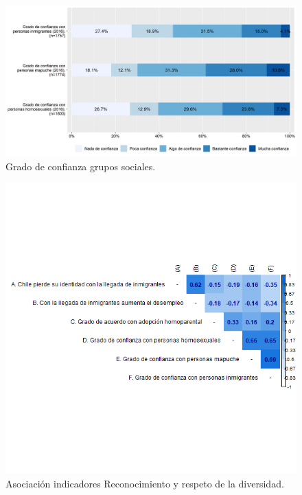 \documentclass[
  12pt,
]{book}
\begin{document}
\begin{figure}[H]

{\centering \includegraphics[width=1\linewidth,height=1\textheight]{output/graphs/diversidad} 

}

\caption{Grado de confianza grupos sociales.}\label{fig:diversidad}
\end{figure}

\begin{figure}[H]

{\centering \includegraphics[width=1\linewidth,height=1\textheight]{output/graphs/diversidad_cor} 

}

\caption{Asociación indicadores Reconocimiento y respeto de la diversidad.}\label{fig:diversidad-cor}
\end{figure}
\end{document}
